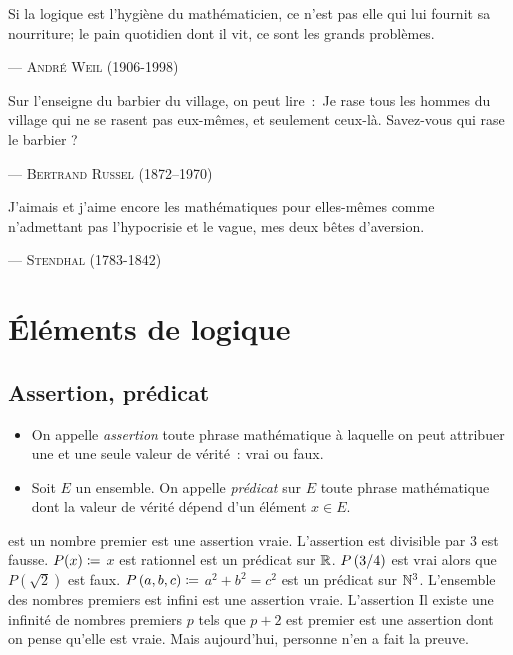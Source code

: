 \documentclass{magnoliaold}
\begin{document}
\setlength{}
\epigraph{\og Si la logique est l'hygiène du mathématicien, ce n'est pas elle qui lui fournit sa
  nourriture; le pain quotidien dont il vit, ce sont les grands problèmes.\fg}{--- \textsc{André Weil (1906-1998)}}
\setlength{}
\epigraph{\og  Sur l’enseigne du barbier du village, on peut lire~:~Je rase tous les hommes du
  village qui ne se rasent pas eux-mêmes, et seulement ceux-là. Savez-vous qui rase
  le barbier ? \fg}{--- \textsc{Bertrand Russel (1872--1970)}}
\setlength{}
\epigraph{\og J'aimais et j'aime encore les mathématiques pour elles-mêmes comme n'admettant
  pas l'hypocrisie et le vague, mes deux bêtes d'aversion.\fg}{--- \textsc{Stendhal (1783-1842)}}

\magtoc

\section{Éléments de logique}

\subsection{Assertion, prédicat}

\begin{definition}[utile=-3]
\begin{itemize}
\item On appelle \emph{assertion} toute phrase mathématique à laquelle
  on peut attribuer une et une seule valeur de vérité~: vrai ou faux.
\item Soit $E$ un ensemble. On appelle \emph{prédicat} sur $E$ toute phrase mathématique
  dont la valeur de vérité dépend d'un élément $x\in E$.
\end{itemize}
\end{definition}

\begin{exemples}
\exemple {} est un nombre premier \fg est une assertion vraie.
  L'assertion  est divisible par 3 \fg est fausse.
\exemple $P(x)\coloneqq$ \og $x$ est rationnel \fg est un prédicat sur $\mathbb{R}$. $P\left(3/4\right)$
  est vrai alors que $P(\sqrt{2})$ est faux.
\exemple $P\left(a,b,c\right)\coloneqq$ \og $a^2+b^2=c^2$ \fg est un prédicat sur $\mathbb{N}^3$.
\exemple \og L'ensemble des nombres premiers est infini \fg est une assertion
  vraie. L'assertion \og Il existe une infinité de nombres premiers $p$ tels
  que $p+2$ est premier \fg est une assertion dont on pense qu'elle est vraie. Mais aujourd'hui, personne n'en a fait la preuve.
\end{exemples}
\end{document}

